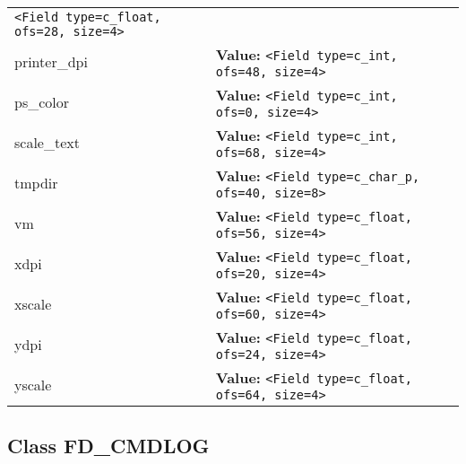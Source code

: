 \begin{longtable}{|p{\varnamewidth}|p{\vardescrwidth}|l}
{\tt {\textless}Field type=c\_float, ofs=28, size=4{\textgreater}}&\\
\cline{1-2}
\raggedright p\-r\-i\-n\-t\-e\-r\-\_\-d\-p\-i\- & \raggedright \textbf{Value:} 
{\tt {\textless}Field type=c\_int, ofs=48, size=4{\textgreater}}&\\
\cline{1-2}
\raggedright p\-s\-\_\-c\-o\-l\-o\-r\- & \raggedright \textbf{Value:} 
{\tt {\textless}Field type=c\_int, ofs=0, size=4{\textgreater}}&\\
\cline{1-2}
\raggedright s\-c\-a\-l\-e\-\_\-t\-e\-x\-t\- & \raggedright \textbf{Value:} 
{\tt {\textless}Field type=c\_int, ofs=68, size=4{\textgreater}}&\\
\cline{1-2}
\raggedright t\-m\-p\-d\-i\-r\- & \raggedright \textbf{Value:} 
{\tt {\textless}Field type=c\_char\_p, ofs=40, size=8{\textgreater}}&\\
\cline{1-2}
\raggedright v\-m\- & \raggedright \textbf{Value:} 
{\tt {\textless}Field type=c\_float, ofs=56, size=4{\textgreater}}&\\
\cline{1-2}
\raggedright x\-d\-p\-i\- & \raggedright \textbf{Value:} 
{\tt {\textless}Field type=c\_float, ofs=20, size=4{\textgreater}}&\\
\cline{1-2}
\raggedright x\-s\-c\-a\-l\-e\- & \raggedright \textbf{Value:} 
{\tt {\textless}Field type=c\_float, ofs=60, size=4{\textgreater}}&\\
\cline{1-2}
\raggedright y\-d\-p\-i\- & \raggedright \textbf{Value:} 
{\tt {\textless}Field type=c\_float, ofs=24, size=4{\textgreater}}&\\
\cline{1-2}
\raggedright y\-s\-c\-a\-l\-e\- & \raggedright \textbf{Value:} 
{\tt {\textless}Field type=c\_float, ofs=64, size=4{\textgreater}}&\\
\cline{1-2}
\end{longtable}



\subsection{Class FD\_CMDLOG}

